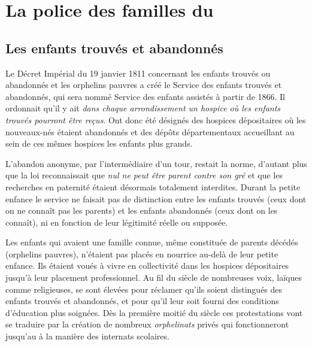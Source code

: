 


\chapter{La police des familles du }


\section{Les enfants trouvés et abandonnés}

 Le Décret Impérial du 19 janvier 1811 concernant les enfants trouvés ou abandonnés et les orphelins pauvres a créé le Service des enfants trouvés et abandonnés, qui sera nommé Service des enfants assistés à partir de 1866. Il ordonnait qu'il y ait \emph{dans chaque arrondissement un hospice où les enfants trouvés pourront être reçus}. Ont donc été désignés des hospices dépositaires où les nouveaux-nés étaient abandonnés et des dépôts départementaux accueillant au sein de ces mêmes hospices les enfants plus grands. 
 
 L'abandon anonyme, par l'intermédiaire d'un tour, restait la norme, d'autant plus que la loi reconnaissait que \emph{nul ne peut être parent contre son gré} et que les recherches en paternité étaient désormais totalement interdites. Durant la petite enfance le service ne faisait pas de distinction entre les enfants trouvés (ceux dont on ne connaît pas les parents) et les enfants abandonnés (ceux dont on les connaît), ni en fonction de leur légitimité réelle ou supposée.
 
 Les enfants qui avaient une famille connue, même constituée de parents décédés (orphelins pauvres), n'étaient pas placés en nourrice au-delà de leur petite enfance. Ils étaient voués à vivre en collectivité dans les hospices dépositaires jusqu'à leur placement professionnel. Au fil du siècle de nombreuses voix, laïques comme religieuses, se sont élevées pour réclamer qu'ils soient distingués des enfants trouvés et abandonnés, et pour qu'il leur soit fourni des conditions d'éducation plus soignées. Dès la première moitié du siècle ces protestations vont se traduire par la création de nombreux \emph{orphelinats} privés qui fonctionneront jusqu'au  à la manière des internats scolaires. 

 

